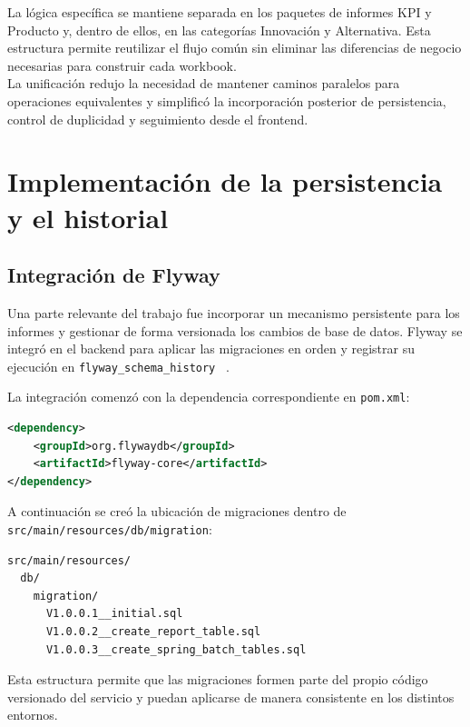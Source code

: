 \documentclass[11pt,a4paper,titlepage,oneside]{report}
\begin{document}
La lógica específica se mantiene separada en los paquetes de informes KPI y
Producto y, dentro de ellos, en las categorías Innovación y Alternativa. Esta
estructura permite reutilizar el flujo común sin eliminar las diferencias de
negocio necesarias para construir cada workbook. \\

La unificación redujo la necesidad de mantener caminos paralelos para
operaciones equivalentes y simplificó la incorporación posterior de
persistencia, control de duplicidad y seguimiento desde el frontend.

\section{Implementación de la persistencia y el historial}

\subsection{Integración de Flyway}
\label{subsec:implementacion-flyway}

Una parte relevante del trabajo fue incorporar un mecanismo persistente para
los informes y gestionar de forma versionada los cambios de base de datos.
Flyway se integró en el backend para aplicar las migraciones en orden y
registrar su ejecución en \texttt{flyway\_schema\_history}
~\cite{FlywayDocs,FlywayVersionedMigrationsDocs}.

La integración comenzó con la dependencia correspondiente en
\texttt{pom.xml}:

\begin{lstlisting}[language=XML, caption={Dependencia de Flyway añadida al backend}]
<dependency>
    <groupId>org.flywaydb</groupId>
    <artifactId>flyway-core</artifactId>
</dependency>
\end{lstlisting}

A continuación se creó la ubicación de migraciones dentro de
\texttt{src/main/resources/db/migration}:

\begin{lstlisting}[caption={Estructura de migraciones de Flyway}]
src/main/resources/
  db/
    migration/
      V1.0.0.1__initial.sql
      V1.0.0.2__create_report_table.sql
      V1.0.0.3__create_spring_batch_tables.sql
\end{lstlisting}

Esta estructura permite que las migraciones formen parte del propio código
versionado del servicio y puedan aplicarse de manera consistente en los
distintos entornos.
\end{document}
